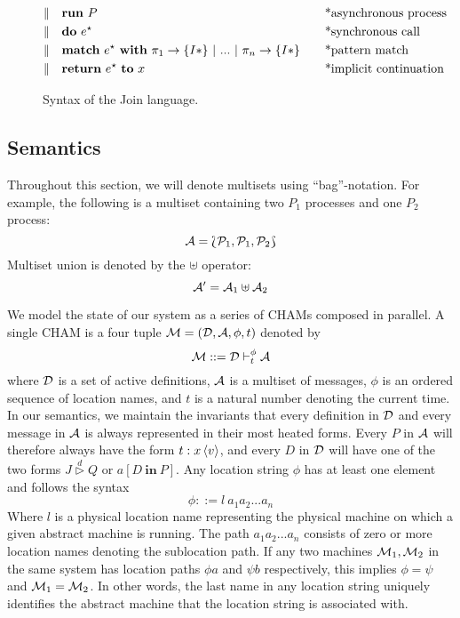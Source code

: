 \begin{figure}
\begin{align*}
\mid\kern-1pt\mid\quad& \mathbf{run}~P  && \quad\textrm{*asynchronous process} \\
\mid\kern-1pt\mid\quad& \mathbf{do}~e^\star && \quad\textrm{*synchronous call} \\
\mid\kern-1pt\mid\quad& \textbf{match}~e^\star~\textbf{with}~\pi_1
               \rightarrow \{ I* \} ~|~ ... ~|~ \pi_n \rightarrow \{ I* \}
                           && \quad\textrm{*pattern match} \\
\mid\kern-1pt\mid\quad& \textbf{return}~e^\star~\textbf{to}~x
                           && \quad\textrm{*implicit continuation}
\end{align*}
\caption{Syntax of the Join language.\label{fig:syntax}}
\end{figure}


\subsection{Semantics}
Throughout this section, we will denote multisets using ``bag''-notation. For
example, the following is a multiset containing two $P_1$ processes and one
$P_2$ process:
\begin{equation*}
 \mathcal{A} = \Lbag \mathcal{P}_1, \mathcal{P}_1, \mathcal{P}_2 \Rbag
\end{equation*}
Multiset union is denoted by the $\uplus$ operator:
\begin{equation*}
 \mathcal{A}' = \mathcal{A}_1 \uplus \mathcal{A}_2
\end{equation*}

We model the state of our system as a series of CHAMs composed in parallel. A
single CHAM is a four tuple $\mathcal{M} = (\mathcal{D}, \mathcal{A}, \phi, t)$ denoted by
\begin{equation*}
 \mathcal{M} ::= \mathcal{D} \vdash_{t}^{\phi} \mathcal{A}
\end{equation*}
where $\mathcal{D}$ is a set of active definitions, $\mathcal{A}$ is a multiset
of messages, $\phi$ is an ordered sequence of location names, and $t$ is a
natural number denoting the current time. In our semantics, we maintain the
invariants that every definition in $\mathcal{D}$ and every message in $\mathcal{A}$ is
always represented in their most heated forms. Every $P$ in $\mathcal{A}$ will therefore
always have the form $\atm t : x<v>$, and every $D$ in $\mathcal{D}$ will have one of the
two forms $J \stackrel{d}{\triangleright} Q$ or $a[D ~\mathbf{in}~ P]$. Any
location string $\phi$ has at least one element and follows the syntax
\begin{equation*}
 \phi ::= l~a_1 a_2 ... a_n
\end{equation*}
Where $l$ is a physical location name representing the physical machine on
which a given abstract machine is running. The path $a_1a_2...a_n$ consists of
zero or more location names denoting the sublocation path. If any two machines
$\mathcal{M}_1, \mathcal{M}_2$ in the same system has location paths $\phi a$ and $\psi b$
respectively, this implies $\phi = \psi$ and $\mathcal{M}_1 = \mathcal{M}_2$. In other words, the
last name in any location string uniquely identifies the abstract machine that
the location string is associated with.

